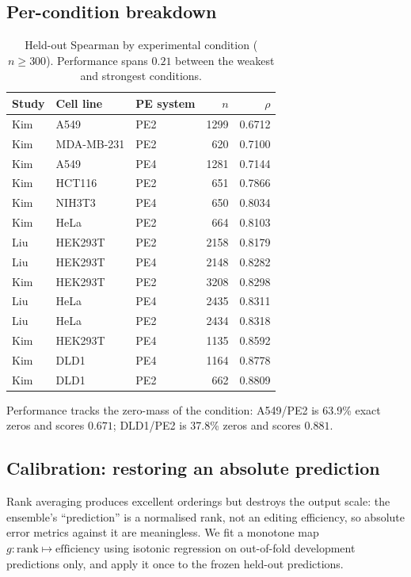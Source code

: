 \documentclass[11pt]{article}
\begin{document}
\subsection{Per-condition breakdown}

\begin{table}[H]
\centering
\caption{Held-out Spearman by experimental condition ($n \geq 300$). Performance spans
$0.21$ between the weakest and strongest conditions.}
\label{tab:percond}
\begin{tabular}{lllrr}
\toprule
Study & Cell line & PE system & $n$ & $\rho$ \\
\midrule
Kim & A549 & PE2 & 1299 & 0.6712 \\
Kim & MDA-MB-231 & PE2 & 620 & 0.7100 \\
Kim & A549 & PE4 & 1281 & 0.7144 \\
Kim & HCT116 & PE2 & 651 & 0.7866 \\
Kim & NIH3T3 & PE4 & 650 & 0.8034 \\
Kim & HeLa & PE2 & 664 & 0.8103 \\
Liu & HEK293T & PE2 & 2158 & 0.8179 \\
Liu & HEK293T & PE4 & 2148 & 0.8282 \\
Kim & HEK293T & PE2 & 3208 & 0.8298 \\
Liu & HeLa & PE4 & 2435 & 0.8311 \\
Liu & HeLa & PE2 & 2434 & 0.8318 \\
Kim & HEK293T & PE4 & 1135 & 0.8592 \\
Kim & DLD1 & PE4 & 1164 & 0.8778 \\
Kim & DLD1 & PE2 & 662 & 0.8809 \\
\bottomrule
\end{tabular}
\end{table}

Performance tracks the zero-mass of the condition: A549/PE2 is 63.9\% exact zeros and
scores $0.671$; DLD1/PE2 is 37.8\% zeros and scores $0.881$.

\subsection{Calibration: restoring an absolute prediction}

Rank averaging produces excellent orderings but destroys the output scale: the
ensemble's ``prediction'' is a normalised rank, not an editing efficiency, so absolute
error metrics against it are meaningless. We fit a monotone map
$g:\text{rank}\mapsto\text{efficiency}$ using isotonic regression on out-of-fold
development predictions only, and apply it once to the frozen held-out predictions.
\end{document}
